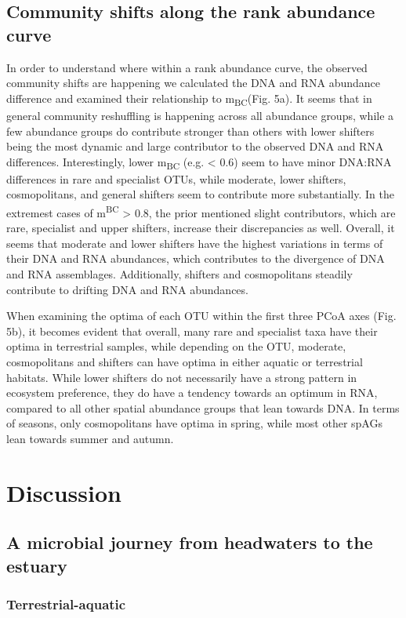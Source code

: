 \documentclass[12pt,a4paper]{article} %
\begin{document}
\subsection*{Community shifts along the rank abundance curve}
In order to understand where within a rank abundance curve, the observed community shifts are happening we calculated the DNA and RNA abundance difference and examined their relationship to m\textsubscript{BC}(Fig. 5a). It seems that in general community reshuffling is happening across all abundance groups, while a few abundance groups do contribute stronger than others with lower shifters being the most dynamic and large contributor to the observed DNA and RNA differences. Interestingly, lower m\textsubscript{BC} (e.g. < 0.6) seem to have minor DNA:RNA differences in rare and specialist OTUs, while moderate, lower shifters, cosmopolitans, and general shifters seem to contribute more substantially. In the extremest cases of m\textsuperscript{BC} > 0.8, the prior mentioned slight contributors, which are rare, specialist and upper shifters, increase their discrepancies as well. Overall, it seems that moderate and lower shifters have the highest variations in terms of their DNA and RNA abundances, which contributes to the divergence of DNA and RNA assemblages. Additionally, shifters and cosmopolitans steadily contribute to drifting DNA and RNA abundances.

When examining the optima of each OTU within the first three PCoA axes (Fig. 5b), it becomes evident that overall, many rare and specialist taxa have their optima in terrestrial samples, while depending on the OTU, moderate, cosmopolitans and shifters can have optima in either aquatic or terrestrial habitats. While lower shifters do not necessarily have a strong pattern in ecosystem preference, they do have a tendency towards an optimum in RNA, compared to all other spatial abundance groups that lean towards DNA. In terms of seasons, only cosmopolitans have optima in spring, while most other spAGs lean towards summer and autumn.

\section*{Discussion}
\subsection*{A microbial journey from headwaters to the estuary}


\subsubsection*{Terrestrial-aquatic}
\end{document}
